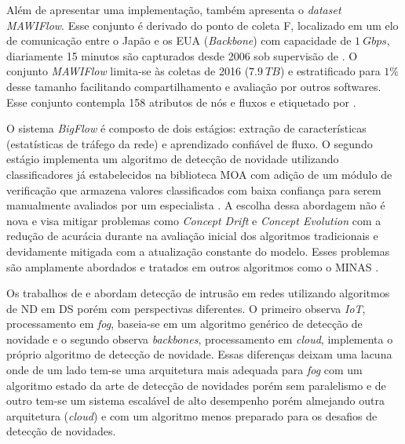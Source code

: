 Além de apresentar uma implementação,  também apresenta o
\emph{dataset} \emph{MAWIFlow}. Esse conjunto é derivado do ponto de coleta
F, localizado em um elo de comunicação entre o Japão e os EUA (\emph{Backbone})
com capacidade de $1\ Gbps$, diariamente 15 minutos são capturados desde 2006
sob supervisão de  \cite{Fontugne2010}. O conjunto
\emph{MAWIFlow} limita-se às coletas de 2016 ($7.9\ TB$) e estratificado para
$1\%$ desse tamanho facilitando compartilhamento e avaliação por outros
softwares. Esse conjunto contempla 158 atributos de nós e fluxos e etiquetado
por .

O sistema \emph{BigFlow} é composto de dois estágios: extração de
características (estatísticas de tráfego da rede) e aprendizado confiável de
fluxo. O segundo estágio implementa um algoritmo de detecção de novidade
utilizando classificadores já estabelecidos na biblioteca MOA \cite{MOA} com
adição de um módulo de verificação que armazena valores classificados com baixa
confiança para serem manualmente avaliados por um especialista \cite{Viegas2019}.
A escolha dessa
abordagem não é nova e visa mitigar problemas como \emph{Concept Drift} e
\emph{Concept Evolution} \cite{Faria2016nd} com a redução de acurácia durante na
avaliação inicial dos algoritmos tradicionais e devidamente mitigada com a
atualização constante do modelo. Esses problemas são amplamente abordados e
tratados em outros algoritmos como o MINAS \cite{Faria2016minas}.

Os trabalhos de  e  abordam
detecção de intrusão em redes utilizando algoritmos de ND em DS porém com
perspectivas diferentes.
O primeiro observa \emph{IoT}, processamento em \emph{fog}, baseia-se em um
algoritmo genérico de detecção de novidade e o segundo observa \emph{backbones},
processamento em \emph{cloud}, implementa o próprio algoritmo de detecção de
novidade. Essas diferenças deixam uma lacuna onde de um lado tem-se uma
arquitetura mais adequada para \emph{fog} com um algoritmo estado da arte de
detecção de novidades porém sem paralelismo e de outro tem-se um sistema
escalável de alto desempenho porém almejando outra arquitetura (\emph{cloud}) e
com um algoritmo menos preparado para os desafios de detecção de novidades.


